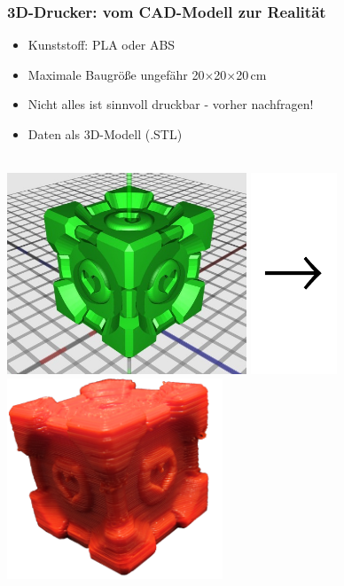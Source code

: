 \documentclass[t]{beamer}
\begin{document}
\begin{frame}
    \frametitle{3D-Drucker: vom CAD-Modell zur Realität}
    \begin{itemize}
        \item Kunststoff: PLA oder ABS
        \item Maximale Baugröße ungefähr 20$\times$20$\times$20\,cm
        \item Nicht alles ist sinnvoll druckbar - vorher nachfragen!
        \item Daten als 3D-Modell (.STL)
    \end{itemize}
    \begin{center}
    ~\\
        \includegraphics[height=6cm]{../img/companioncube_render.png}
        \includegraphics[height=6cm]{../img/pfeil.pdf}
        \includegraphics[height=6cm]{../img/companioncube.png}
    \end{center}
\end{frame}
\end{document}
